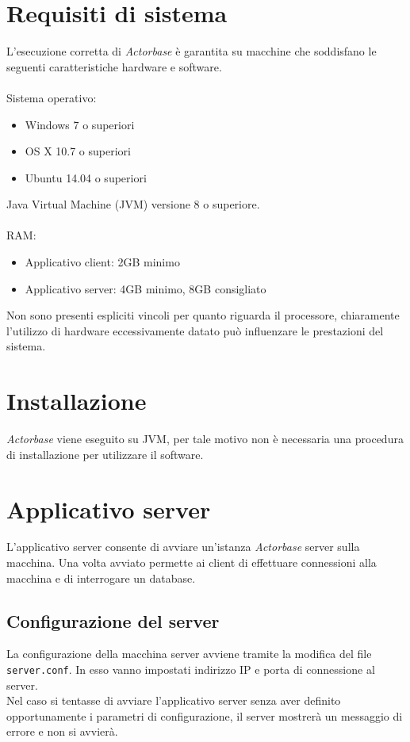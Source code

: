 \documentclass[a4paper]{article}
\begin{document}
	\newpage



	\section{Requisiti di sistema}	
	L'esecuzione corretta di \emph{Actorbase} è garantita su macchine che soddisfano le seguenti caratteristiche hardware e software.
	\\ \\
	Sistema operativo:
	\begin{itemize}
		\item Windows 7 o superiori
		\item OS X 10.7 o superiori
		\item Ubuntu 14.04 o superiori
	\end{itemize}
	Java Virtual Machine (JVM) versione 8 o superiore.
	\\ \\
	RAM:
	\begin{itemize}
		\item Applicativo client: 2GB minimo
		\item Applicativo server: 4GB minimo, 8GB consigliato
	\end{itemize}
	Non sono presenti espliciti vincoli per quanto riguarda il processore, chiaramente l'utilizzo di hardware eccessivamente datato può influenzare le prestazioni del sistema.
	
	\section{Installazione}
	\emph{Actorbase} viene eseguito su JVM, per tale motivo non è necessaria una procedura di installazione per utilizzare il software. 
	\newpage



	\section{Applicativo server}
	L'applicativo server consente di avviare un'istanza \emph{Actorbase} server sulla macchina. Una volta avviato permette ai client di effettuare connessioni alla macchina e di interrogare un database. 
	
	\subsection{Configurazione del server}
	La configurazione della macchina server avviene tramite la modifica del file \texttt{server.conf}. In esso vanno impostati indirizzo IP e porta di connessione al server.
	\\
	Nel caso si tentasse di avviare l'applicativo server senza aver definito opportunamente i parametri di configurazione, il server mostrerà un messaggio di errore e non si avvierà.
	
\end{document}
